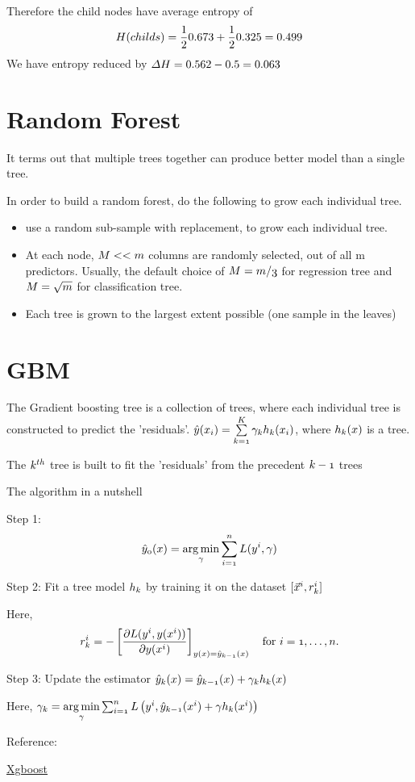 \documentclass[12pt, oneside]{article}
\begin{document}
Therefore the child nodes have average entropy of 
$$
\mathnormal{H(childs)}=\frac{1}{2} 0.673+\frac{1}{2} 0.325=0.499
$$
We have entropy reduced by $\mathnormal{\Delta H}=0.562-0.5=0.063$




\section{Random Forest}

It terms out that multiple trees together can produce better model than a single tree. 

In order to build a random forest, do the following to grow each individual tree.
\begin{itemize}
\item  use a random sub-sample with replacement, to grow each individual tree.
\item  At each node,  $\mathnormal{M<<m}$ columns are randomly selected, out of all m predictors. Usually, the default choice of $\mathnormal{M=m/3}$ for regression tree and $\mathnormal{M=\sqrt{m}}$ for classification tree.
\item Each tree is grown to the largest extent possible (one sample in the leaves)

\end{itemize}

\section{GBM}

The Gradient boosting tree is a collection of trees, where each individual tree is constructed to predict the 'residuals'.
$\mathnormal{\hat{y}(x_i)=\sum\limits_{k=1}^K \gamma_k h_k(x_i)}$, where $\mathnormal{h_k(x)}$ is a tree. 

The $\mathnormal{k^{th}}$ tree is built to fit the 'residuals' from the precedent $\mathnormal{k-1}$ trees  

The algorithm in a nutshell

Step 1: 
$$\mathnormal{\hat{y}_0(x) = \underset{\gamma}{\arg\min} \sum_{i=1}^n L(y^i, \gamma)}$$

Step 2: Fit a tree model $\mathnormal{h_{k}}$ by training it on the dataset $\mathnormal{[\vec{x}^i, r^{i}_{k}]}$

Here,
$$\mathnormal{r^{i}_{k} = -\left[\frac{\partial L(y^i, {y}(x^i))}{\partial y(x^i)}\right]_{{y}(x)=\hat{y}_{k-1}(x)} \quad \mbox{for } i=1,\ldots,n.}$$

Step 3: Update the estimator $\mathnormal{\hat{y}_{k}(x)=\hat{y}_{{k-1}}(x)+\gamma _{k}h_{k}(x)}$ 

Here, 
$\mathnormal{\gamma_k = \underset{\gamma}{\operatorname{arg\,min}} \sum_{i=1}^n L\left(y^i, \hat{y}_{k-1}(x^i) + \gamma h_k(x^i)\right)}$

Reference: 

\href{https://homes.cs.washington.edu/~tqchen/pdf/BoostedTree.pdf}{Xgboost}
\end{document}
